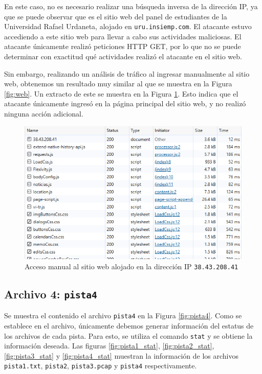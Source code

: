 \documentclass{article}
\begin{document}
En este caso, no es necesario realizar una búsqueda inversa de la dirección IP, ya que se puede observar que es el sitio web del panel de estudiantes de la Universidad Rafael Urdaneta, alojado en \texttt{uru.insiemp.com}. El atacante estuvo accediendo a este sitio web para llevar a cabo sus actividades maliciosas. El atacante únicamente realizó peticiones HTTP GET, por lo que no se puede determinar con exactitud qué actividades realizó el atacante en el sitio web.

Sin embargo, realizando un análisis de tráfico al ingresar manualmente al sitio web, obtenemos un resultado muy similar al que se muestra en la Figura \ref{fig:web}. Un extracto de este se muestra en la Figura \ref{fig:web_manual}. Esto indica que el atacante únicamente ingresó en la página principal del sitio web, y no realizó ninguna acción adicional.

\begin{figure}[ht!]
  \includegraphics[width=\textwidth]{web_manual.png}
  \caption{Acceso manual al sitio web alojado en la dirección IP \texttt{38.43.208.41}}
  \label{fig:web_manual}
\end{figure}

\subsection{Archivo 4: \texttt{pista4}}

Se muestra el contenido el archivo \texttt{pista4} en la Figura \ref{fig:pista4}. Como se establece en el archivo, únicamente debemos generar información del estatus de los archivos de cada pista. Para esto, se utiliza el comando \texttt{stat} y se obtiene la información deseada. Las figuras \ref{fig:pista1_stat}, \ref{fig:pista2_stat}, \ref{fig:pista3_stat} y \ref{fig:pista4_stat} muestran la información de los archivos \texttt{pista1.txt}, \texttt{pista2}, \texttt{pista3.pcap} y \texttt{pista4} respectivamente.
\end{document}
